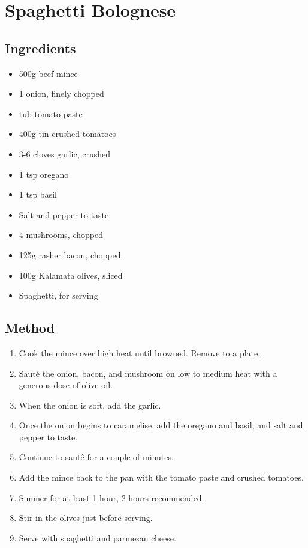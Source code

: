 \clearpage
\section{Spaghetti Bolognese}


\begin{multicols}{2}
  \subsection{Ingredients}
    \begin{itemize}
      \item 500g beef mince
      \item 1 onion, finely chopped
      \item {} tub tomato paste
      \item 400g tin crushed tomatoes
      \item 3-6 cloves garlic, crushed
      \item 1 tsp oregano
      \item 1 tsp basil
      \item Salt and pepper to taste
      \item 4 mushrooms, chopped
      \item 125g rasher bacon, chopped
      \item 100g Kalamata olives, sliced
      \item Spaghetti, for serving
    \end{itemize}
  \vfill\null
  \columnbreak
  \subsection{Method}
    \begin{enumerate}
      \item Cook the mince over high heat until browned. Remove to a plate.
      \item Saut\'e the onion, bacon, and mushroom on low to medium heat with a generous dose of olive oil.
      \item When the onion is soft, add the garlic.
      \item Once the onion begins to caramelise, add the oregano and basil, and salt and pepper to taste.
      \item Continue to saut\^e for a couple of minutes.
      \item Add the mince back to the pan with the tomato paste and crushed tomatoes.
      \item Simmer for at least 1 hour, 2 hours recommended.
      \item Stir in the olives just before serving.
      \item Serve with spaghetti and parmesan cheese.
    \end{enumerate}
  \end{multicols}
